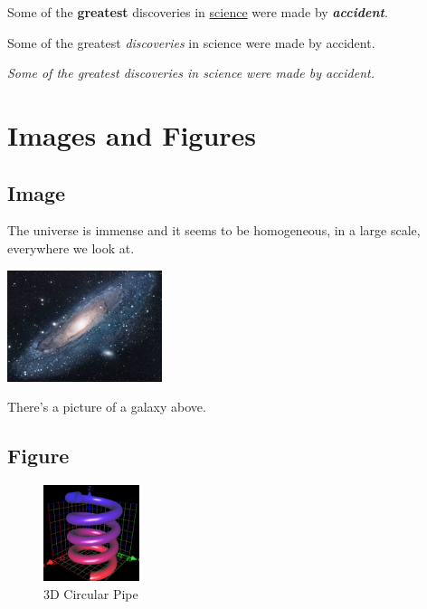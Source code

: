 \documentclass[12pt, a4paper]{report}
\begin{document}

Some of the \textbf{greatest} discoveries in \underline{science} were made by \textbf{\textit{accident}}. %

Some of the greatest \emph{discoveries} in science were made by accident.

\textit{Some of the greatest \emph{discoveries} in science were made by accident.}

\section{Images and Figures}

\subsection{Image}
The universe is immense and it seems to be homogeneous, in a large scale, everywhere we look at.

\includegraphics{universe} %

There's a picture of a galaxy above.

\subsection{Figure}
\begin{figure}[h] %
    \centering
    \includegraphics[width=0.25\textwidth]{graph}
    \caption{3D Circular Pipe}
    \label{fig:3D Torus}
\end{figure}
\end{document}
